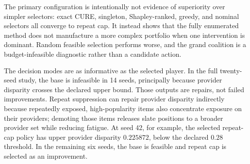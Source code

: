 \documentclass[review]{elsarticle}
\theoremstyle{plain}
\theoremstyle{definition}
\theoremstyle{remark}
\begin{document}
\begin{table}[t]
\caption{Held-out selector evaluation. Portfolios are selected on five seeds and evaluated on 20 disjoint seeds. The independent inferential unit is the evaluation seed; 100 cross-product rows are retained for traceability but are not treated as 100 independent observations.}\label{tab:selector-baselines}
\centering
\scriptsize
\setlength{\tabcolsep}{3pt}
\end{table}

The primary configuration is intentionally not evidence of superiority over simpler selectors: exact CURE, singleton, Shapley-ranked, greedy, and nominal selectors all converge to repeat cap. It instead shows that the fully enumerated method does not manufacture a more complex portfolio when one intervention is dominant. Random feasible selection performs worse, and the grand coalition is a budget-infeasible diagnostic rather than a candidate action.

The decision modes are as informative as the selected player. In the full twenty-seed study, the base is infeasible in 14 seeds, principally because provider disparity crosses the declared upper bound. Those outputs are repairs, not failed improvements. Repeat suppression can repair provider disparity indirectly because repeatedly exposed, high-popularity items also concentrate exposure on their providers; demoting those items releases slate positions to a broader provider set while reducing fatigue. At seed 42, for example, the selected repeat-cap policy has upper provider disparity $0.225872$, below the declared $0.28$ threshold. In the remaining six seeds, the base is feasible and repeat cap is selected as an improvement.
\end{document}
